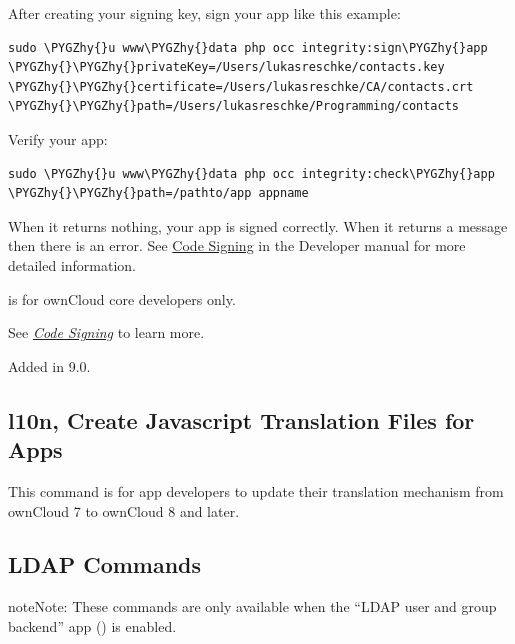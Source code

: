 \documentclass[letterpaper,10pt,english]{sphinxmanual}
\def\PYGZhy{\char`\-}
\begin{document}
After creating your signing key, sign your app like this example:

\begin{Verbatim}[commandchars=\\\{\}]
sudo \PYGZhy{}u www\PYGZhy{}data php occ integrity:sign\PYGZhy{}app \PYGZhy{}\PYGZhy{}privateKey=/Users/lukasreschke/contacts.key \PYGZhy{}\PYGZhy{}certificate=/Users/lukasreschke/CA/contacts.crt \PYGZhy{}\PYGZhy{}path=/Users/lukasreschke/Programming/contacts
\end{Verbatim}

Verify your app:

\begin{Verbatim}[commandchars=\\\{\}]
sudo \PYGZhy{}u www\PYGZhy{}data php occ integrity:check\PYGZhy{}app \PYGZhy{}\PYGZhy{}path=/pathto/app appname
\end{Verbatim}

When it returns nothing, your app is signed correctly. When it returns a message then there is an error. See \href{https://doc.owncloud.org/server/9.0/developer\_manual/app/code\_signing.html\#how-to-get-your-app-signed}{Code Signing} in the Developer manual for more detailed information.

 is for ownCloud core developers only.

See {\hyperref[issues/code_signing::doc]{\emph{\emph{Code Signing}}}} to learn more.

Added in 9.0.


\subsection{l10n, Create Javascript Translation Files for Apps}
\label{configuration_server/occ_command:l10n-create-javascript-translation-files-for-apps}\label{configuration_server/occ_command:create-javascript-translation-files-label}
This command is for app developers to update their translation mechanism from
ownCloud 7 to ownCloud 8 and later.


\subsection{LDAP Commands}
\label{configuration_server/occ_command:ldap-commands}\label{configuration_server/occ_command:ldap-commands-label}
\begin{notice}{note}{Note:}
These commands are only available when the ``LDAP user and group backend'' app
() is enabled.
\end{notice}
\end{document}
